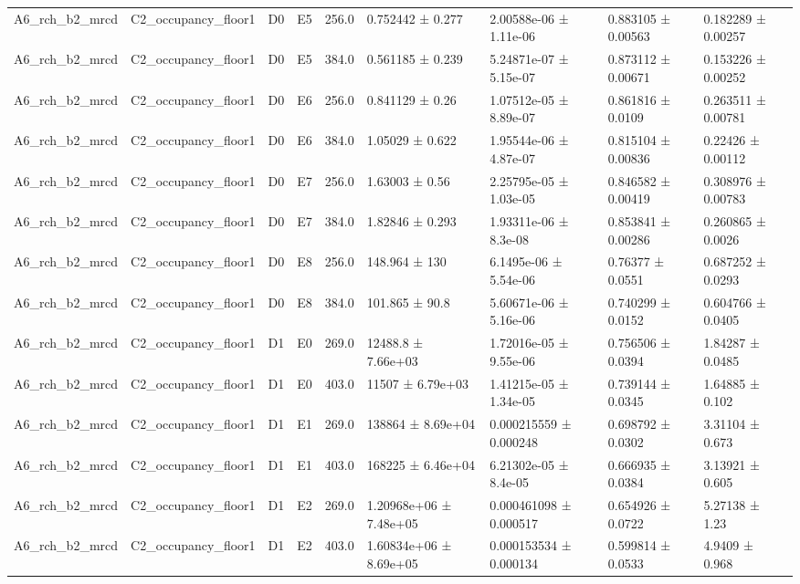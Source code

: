 \begin{table}
\begin{tabular}{lllllllll}
A6\_rch\_b2\_mrcd & C2\_occupancy\_floor1 & D0 & E5 & 256.0 & 0.752442 ± 0.277 & 2.00588e-06 ± 1.11e-06 & 0.883105 ± 0.00563 & 0.182289 ± 0.00257 \\
A6\_rch\_b2\_mrcd & C2\_occupancy\_floor1 & D0 & E5 & 384.0 & 0.561185 ± 0.239 & 5.24871e-07 ± 5.15e-07 & 0.873112 ± 0.00671 & 0.153226 ± 0.00252 \\
A6\_rch\_b2\_mrcd & C2\_occupancy\_floor1 & D0 & E6 & 256.0 & 0.841129 ± 0.26 & 1.07512e-05 ± 8.89e-07 & 0.861816 ± 0.0109 & 0.263511 ± 0.00781 \\
A6\_rch\_b2\_mrcd & C2\_occupancy\_floor1 & D0 & E6 & 384.0 & 1.05029 ± 0.622 & 1.95544e-06 ± 4.87e-07 & 0.815104 ± 0.00836 & 0.22426 ± 0.00112 \\
A6\_rch\_b2\_mrcd & C2\_occupancy\_floor1 & D0 & E7 & 256.0 & 1.63003 ± 0.56 & 2.25795e-05 ± 1.03e-05 & 0.846582 ± 0.00419 & 0.308976 ± 0.00783 \\
A6\_rch\_b2\_mrcd & C2\_occupancy\_floor1 & D0 & E7 & 384.0 & 1.82846 ± 0.293 & 1.93311e-06 ± 8.3e-08 & 0.853841 ± 0.00286 & 0.260865 ± 0.0026 \\
A6\_rch\_b2\_mrcd & C2\_occupancy\_floor1 & D0 & E8 & 256.0 & 148.964 ± 130 & 6.1495e-06 ± 5.54e-06 & 0.76377 ± 0.0551 & 0.687252 ± 0.0293 \\
A6\_rch\_b2\_mrcd & C2\_occupancy\_floor1 & D0 & E8 & 384.0 & 101.865 ± 90.8 & 5.60671e-06 ± 5.16e-06 & 0.740299 ± 0.0152 & 0.604766 ± 0.0405 \\
A6\_rch\_b2\_mrcd & C2\_occupancy\_floor1 & D1 & E0 & 269.0 & 12488.8 ± 7.66e+03 & 1.72016e-05 ± 9.55e-06 & 0.756506 ± 0.0394 & 1.84287 ± 0.0485 \\
A6\_rch\_b2\_mrcd & C2\_occupancy\_floor1 & D1 & E0 & 403.0 & 11507 ± 6.79e+03 & 1.41215e-05 ± 1.34e-05 & 0.739144 ± 0.0345 & 1.64885 ± 0.102 \\
A6\_rch\_b2\_mrcd & C2\_occupancy\_floor1 & D1 & E1 & 269.0 & 138864 ± 8.69e+04 & 0.000215559 ± 0.000248 & 0.698792 ± 0.0302 & 3.31104 ± 0.673 \\
A6\_rch\_b2\_mrcd & C2\_occupancy\_floor1 & D1 & E1 & 403.0 & 168225 ± 6.46e+04 & 6.21302e-05 ± 8.4e-05 & 0.666935 ± 0.0384 & 3.13921 ± 0.605 \\
A6\_rch\_b2\_mrcd & C2\_occupancy\_floor1 & D1 & E2 & 269.0 & 1.20968e+06 ± 7.48e+05 & 0.000461098 ± 0.000517 & 0.654926 ± 0.0722 & 5.27138 ± 1.23 \\
A6\_rch\_b2\_mrcd & C2\_occupancy\_floor1 & D1 & E2 & 403.0 & 1.60834e+06 ± 8.69e+05 & 0.000153534 ± 0.000134 & 0.599814 ± 0.0533 & 4.9409 ± 0.968 \\

\end{tabular}
\end{table}
